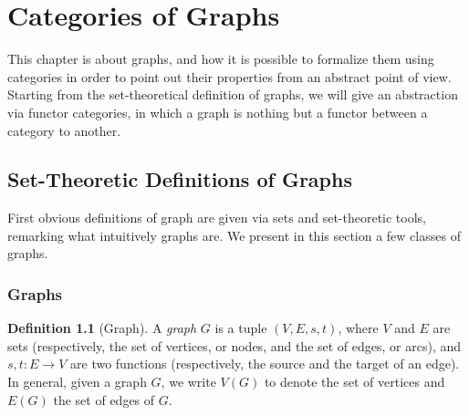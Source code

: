 \documentclass[a4paper, twoside,openright]{report}
\theoremstyle{plain}
\theoremstyle{definition}
\newtheorem{definition}[theorem]{Definition}
\begin{document}
\color{red}{ [DC]Alcuni commenti su questo capitolo. Non sono soddisfatto dall'ordine della presentazione. Io  personalmente proporrei il seguente indice:

Sec. 1 Categorie e funtori

>def di categorie
	-menzionare che data una categoria c'è il duale
	-epi, mono e  iso

>funtori e trasf naturali

>categorie comma (con slice e coslice come sottocaso)

Sec. 2: Limiti e colimiti
Io sinceramente questa la riscriverei completamente. La definizione di (co)limite deve venire prima e solo dopo deve venire l'elenco degli esempi. Struttura che propongo:

>definizione, esempi e se avanza tempo come si calcolano (co)limiti generali a partire da quelli "base" (tipo prodotti da pb e equalizzatori) 
	-epi e mono regolari

>Limiti nelle categorie di funtori e comma


Sec. 3: Adesività
Unica osservazione che ho per ora è che terrei il cubo invece del diagramma che hai fatto}
\color{black}


\chapter{Categories of Graphs}
This chapter is about graphs, and how it is possible to formalize them using categories in order to point out their properties from an abstract point of view. Starting from the set-theoretical definition of graphs, we will give an abstraction via functor categories, in which a graph is nothing but a functor between a category to another.

\section{Set-Theoretic Definitions of Graphs}

First obvious definitions of graph are given via sets and set-theoretic tools, remarking what intuitively graphs are. We present in this section a few classes of graphs.

\subsection{Graphs}

\begin{definition}[Graph]
    A \emph{graph} $G$ is a tuple $(V, E, s, t)$, where $V$ and $E$ are sets (respectively, the set of vertices, or nodes, and the set of edges, or arcs), and $s, t: E \rightarrow V$ are two functions (respectively, the source and the target of an edge).
    In general, given a graph $G$, we write $V(G)$ to denote the set of vertices and $E(G)$ the set of edges of $G$.
\end{definition}
\end{document}
